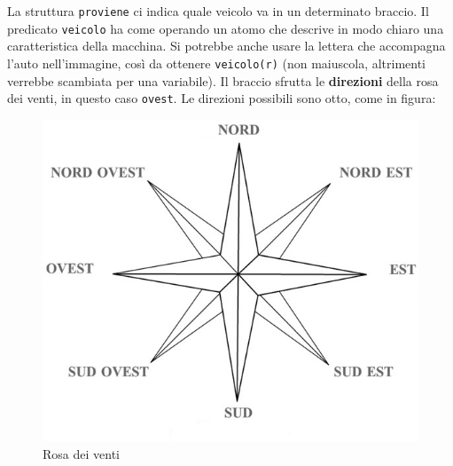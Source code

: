 La struttura \texttt{proviene} ci indica quale veicolo va in un determinato braccio. Il predicato \texttt{veicolo} ha come operando un atomo che descrive in modo chiaro una caratteristica della macchina. Si potrebbe anche usare la lettera che accompagna l'auto nell'immagine, così da ottenere \texttt{veicolo(r)} (non maiuscola, altrimenti verrebbe scambiata per una variabile). Il braccio sfrutta le \textbf{direzioni} della rosa dei venti, in questo caso \texttt{ovest}. Le direzioni possibili sono otto, come in figura:

\begin{figure}[htb]
	\centering
	\includegraphics[width=.5\textwidth]{images/rose}
	\caption{Rosa dei venti}
\end{figure}


